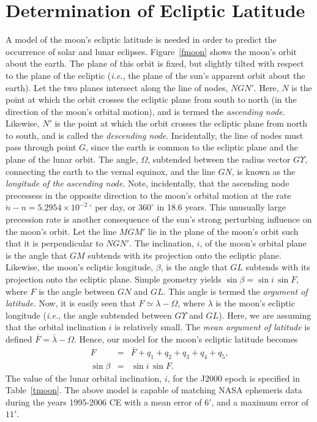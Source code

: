 \section{Determination of Ecliptic Latitude}
A model of the moon's ecliptic latitude is needed in order to predict the
occurrence of solar and lunar eclipses. Figure~\ref{fmoon} shows the
moon's orbit about the earth. The plane of this orbit is fixed, but slightly tilted with
respect to the plane of the ecliptic ({\em i.e.}, the plane of the sun's
apparent orbit about the earth). Let the two planes intersect along the
line of nodes, $NGN'$. Here, $N$ is the point at which the orbit crosses the
ecliptic plane from south to north (in the direction of the moon's orbital
motion), and is termed the {\em ascending node}. Likewise, $N'$ is the
point at which the orbit crosses the ecliptic plane from north to south,
and is called the {\em descending node}. Incidentally, the line of nodes must pass through point $G$, since the earth is common to the ecliptic plane and the plane of the lunar orbit.
The angle, $\Omega$, subtended between
 the radius vector $G\Upsilon$, connecting the earth to the vernal equinox,
and the line $GN$, is known as the {\em longitude of the ascending node}. Note, incidentally, that
the ascending node precessess in the opposite direction to the moon's orbital motion
at the rate  $\breve{n}-n = 5.2954\times 10^{-2}\, ^\circ$ per day, or $360^\circ$ in 18.6 years. 
This unusually large precession rate is another consequence of the sun's strong perturbing influence on the
moon's orbit.
Let the line $MGM'$ lie in the plane
of the moon's orbit such that it is perpendicular to $NGN'$.
The inclination, $i$,  of the moon's orbital plane is the angle
that $GM$ subtends with its projection onto the ecliptic plane. Likewise, the
moon's ecliptic longitude, $\beta$, is the angle that $GL$ subtends with its
projection onto the ecliptic plane.
Simple geometry
yields $\sin\beta = \sin i\,\sin F$, where $F$ is the angle
between $GN$ and $GL$. This angle is termed the {\em argument of latitude.} 
Now, it is easily seen that $F \simeq \lambda-\Omega$, where $\lambda$
is the moon's ecliptic longitude ({\em i.e.}, the angle subtended
between  $G\Upsilon$ and $GL$). Here, we are assuming that the orbital
inclination $i$ is relatively
small. The {\em mean argument of latitude} is defined $\bar{F} = \bar{\lambda}-\Omega$. 
 Hence, our model for the moon's ecliptic latitude becomes
\begin{eqnarray}
F &=&\bar{F}+q_1+q_2+q_3+q_4+q_5,\\[0.5ex]
\sin\beta &=& \sin i\,\sin F.\label{emoonlat}
\end{eqnarray}
The value of the lunar orbital inclination, $i$,  for the
J2000 epoch is specified in Table~\ref{tmoon}. The above model is capable of
matching NASA ephemeris data during the years 1995-2006 CE with
a mean error of $6'$, and a maximum error of $11'$.

